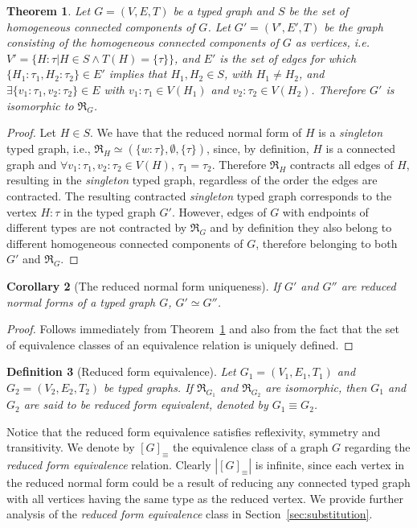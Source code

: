 \documentclass[preprint,12pt]{elsarticle}
\theoremstyle{plain}
\newtheorem{theorem}{Theorem}[section]
\newtheorem{corollary}[theorem]{Corollary}
\newtheorem{definition}[theorem]{Definition}
\newcommand\tyv[2]{#1\!\!:\!\!#2}
\begin{document}
\begin{theorem}\label{theorem:ETCCequiv}
Let $G = (V,E,T)$ be a typed graph
and $S$ be the set of homogeneous connected components of $G$.
Let $G' = (V',E',T)$ be the graph consisting of the homogeneous connected components of $G$ as vertices, i.e.
$V' = \{\tyv{H}{\tau}|H\in S \wedge T(H) = \{\tau\} \}$, and
$E'$ is the set of edges for which $\{\tyv{H_1}{\tau_1},\tyv{H_2}{\tau_2}\}\in E'$
implies that $H_1,H_2\in S$, with $H_1\neq H_2$, and $\exists \{\tyv{v_1}{\tau_1}, \tyv{v_2}{\tau_2}\}\in E$
with $\tyv{v_1}{\tau_1}\in V(H_1)$ and $\tyv{v_2}{\tau_2}\in V(H_2)$.
Therefore $G'$ is isomorphic to $\Re_G$.
\end{theorem}
\begin{proof}
Let $H\in S$. We have that the reduced normal form of $H$ is a \textit{singleton} typed graph,
i.e., $\Re_H \simeq (\{\tyv{w}{\tau}\}, \emptyset, \{\tau\})$,
since, by definition, $H$ is a connected graph and
$\forall \tyv{v_1}{\tau_1}, \tyv{v_2}{\tau_2} \in V(H)$, $\tau_1=\tau_2$.
Therefore $\Re_H$ contracts all edges of $H$, resulting in the \textit{singleton} typed graph,
regardless of the order the edges are contracted.
The resulting contracted \textit{singleton} typed graph corresponds to the
vertex $\tyv{H}{\tau}$ in the typed graph $G'$.
However, edges of $G$ with endpoints of different types are not contracted by $\Re_G$
and by definition they also belong to different homogeneous connected components
of $G$, therefore belonging to both $G'$ and $\Re_G$.
\end{proof}

\begin{corollary}[The reduced normal form uniqueness]\label{cor:uniquereducedgraph}
If $G'$ and $G''$ are reduced normal forms of a typed graph $G$,
$G' \simeq G''$.
\end{corollary}
\begin{proof}
Follows immediately from Theorem~\ref{theorem:ETCCequiv} and also from the fact
that the set of equivalence classes of an equivalence relation is uniquely defined.
\end{proof}

\begin{definition}[Reduced form equivalence]
Let $G_1 = (V_1,E_1,T_1)$ and $G_2 = (V_2,E_2,T_2)$ be typed graphs.
If $\Re_{G_1}$ and $\Re_{G_2}$ are isomorphic, then $G_1$ and $G_2$ are said to
be \textit{reduced form equivalent}, denoted by $G_1 \equiv G_2$.
\end{definition}

Notice that the reduced form equivalence satisfies reflexivity, symmetry and transitivity.
We denote by $[G]_\equiv$ the equivalence class
of a graph $G$ regarding the \textit{reduced form equivalence} relation.
Clearly $|[G]_\equiv|$ is infinite, since each vertex in the reduced normal form
could be a result of reducing any connected typed graph with all vertices having the same
type as the reduced vertex.
We provide further analysis of the \textit{reduced form equivalence} class
in Section~\ref{sec:substitution}.
\end{document}
